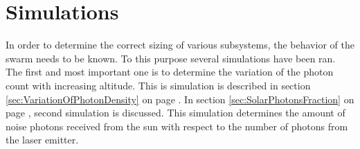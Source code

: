 \section{Simulations}
\label{sec:Simulations}

In order to determine the correct sizing of various subsystems, the behavior of the swarm needs to be known. To this purpose several simulations have been ran. The first and most important one is to determine the variation of the photon count with increasing altitude. This is simulation is described in section \ref{sec:VariationOfPhotonDensity} on page \pageref{sec:VariationOfPhotonDensity}. In section \ref{sec:SolarPhotonsFraction} on page \pageref{sec:SolarPhotonsFraction}, second simulation is discussed. This simulation determines the amount of noise photons received from the sun with respect to the number of photons from the \ac{laser} emitter.
